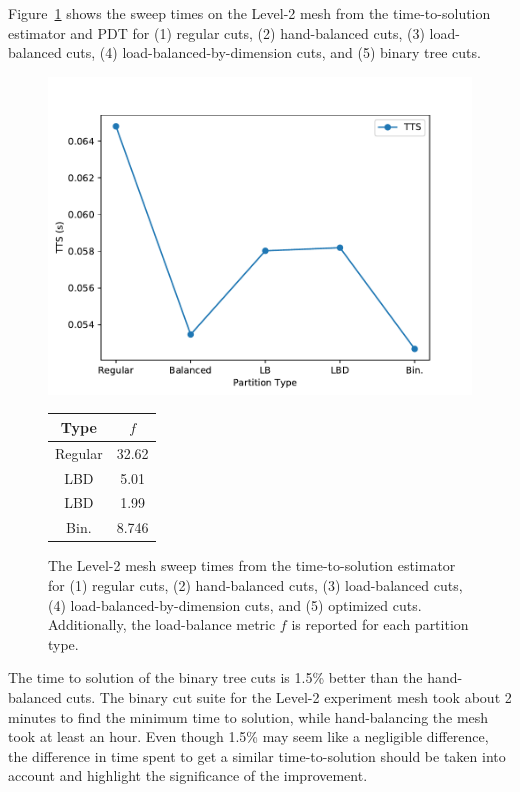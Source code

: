 Figure~\ref{level2_opt} shows the sweep times on the Level-2 mesh from the time-to-solution estimator and PDT for (1) regular cuts, (2) hand-balanced cuts, (3) load-balanced cuts, (4) load-balanced-by-dimension cuts, and (5) binary tree cuts.
\begin{figure}[h]
\begin{minipage}[c]{0.65\textwidth}
\centering
\includegraphics[scale=0.775]{../../figures/level2_sweep_comp_best.pdf}
\end{minipage}
\begin{minipage}[c]{0.33\textwidth}
\begin{table}[H]
\centering
\begin{tabular}{c|c}
\textbf{Type} & \bf $f$ \\ \hline
Regular &  32.62 \\ \hline
LBD & 5.01 \\ \hline
LBD &  1.99\\ \hline
Bin. & 8.746 \\ \hline
\end{tabular}
\end{table}
\end{minipage}
\caption{The Level-2 mesh sweep times from the time-to-solution estimator for (1) regular cuts, (2) hand-balanced cuts, (3) load-balanced cuts, (4) load-balanced-by-dimension cuts, and (5) optimized cuts. Additionally, the load-balance metric $f$ is reported for each partition type. }
\label{level2_opt}
\end{figure}
The time to solution of the binary tree cuts is 1.5\% better than the hand-balanced cuts.
The binary cut suite for the Level-2 experiment mesh took about 2 minutes to find the minimum time to solution, while hand-balancing the mesh took at least an hour.
Even though 1.5\% may seem like a negligible difference, the difference in time spent to get a similar time-to-solution should be taken into account and highlight the significance of the improvement.

